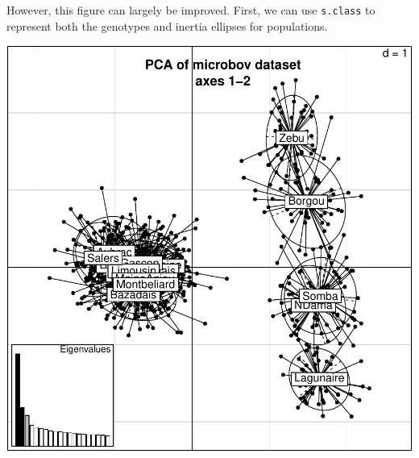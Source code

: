 \documentclass{article}
\begin{document}
\noindent However, this figure can largely be improved.
First, we can use \texttt{s.class} to represent both the genotypes and inertia ellipses for populations.
\begin{Schunk}
\end{Schunk}
\includegraphics{figs/base-071}
\end{document}

